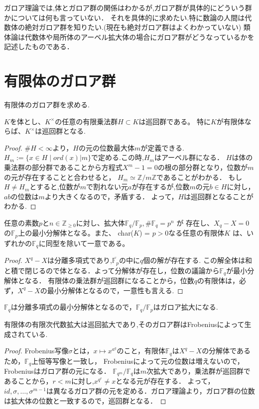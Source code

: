 \documentclass{ujarticle}
\begin{document}
ガロア理論では,体とガロア群の関係はわかるが,ガロア群が具体的にどういう群かについては何も言っていない．
それを具体的に求めたい.特に数論の人間は代数体の絶対ガロア群を知りたい.(現在も絶対ガロア群はよくわかっていない)
類体論は代数体や局所体のアーベル拡大体の場合にガロア群がどうなっているかを記述したものである．

\section{有限体のガロア群}
\label{sec:有限体のガロア群}

有限体のガロア群を求める.

\begin{prop}
  $K$を体とし、$K^{\times}$の任意の有限乗法群$H \subset  K$は巡回群である。
  特に$K$が有限体ならば、$K^{\times}$は巡回群となる.
\end{prop}
\begin{proof}
  $\# H < \infty$より，$H$の元の位数最大体$m$が定義できる.
  $H_m:= \{ x \in H \mid ord(x) | m\} $で定める.この時,$H_m$はアーベル群になる．
  $H$は体の乗法群の部分群であることから方程式$X^m -1 =0$の根の部分群となり，位数が$m$の元が存在することと合わせると，
  $H_m \simeq \mathbb{Z}/m \mathbb{Z}$であることがわかる．
  もし$H \neq H_m$とすると,位数が$m$で割れない元$a$が存在するが,位数$m$の元$b \in H$に対し，$ab$の位数は$m$より大きくなるので，矛盾する．
  よって，$H$は巡回群となることがわかる.
\end{proof}
\begin{prop}
任意の素数$p$と$n\in  \mathbb{Z}_{\ge 0}$に対し、拡大体$\mathbb{F}_q/\mathbb{F}_p, \#\mathbb{F}_q  =p^n$ が
存在し、$X_q − X = 0$ の$\mathbb{F}_p$上の最小分解体となる。また、
char($K$) = $p > 0$なる任意の有限体$K$ は、いずれかの$\mathbb{F}_q$に同型を除いて一意である。
\end{prop}
\begin{proof}
$X^q -X$は分離多項式であり,$\overline{\mathbb{F}_p}$の中に$q$個の解が存在する.
この解全体は和と積で閉じるので体となる．よって分解体が存在し，位数の議論から$\mathbb{F}_q$が最小分解体となる．
有限体の乗法群が巡回群になることから，位数$q$の有限体は，必ず，$X^q - X$の最小分解体となるので，一意性も言える.
\end{proof}

$\mathbb{F}_q$は分離多項式の最小分解体となるので，$\mathbb{F}_q/\mathbb{F}_p$はガロア拡大になる.
\begin{thm}
有限体の有限次代数拡大は巡回拡大であり,そのガロア群はFrobeniusによって生成されている.
\end{thm}
\begin{proof}
  Frobenius写像$\sigma$とは，$x \mapsto x^{a^q}$のこと，有限体$\mathbb{F}_q$は$X^q -X$の分解体であるため，$\mathbb{F}_q$上恒等写像と一致し，
  Frobeniusによって元の位数は増えないので，Frobeniusはガロア群の元になる．
  $\mathbb{F}_{q^m}/\mathbb{F}_q$は$m$次拡大であり，乗法群が巡回群であることから，$r < m$に対し,$x^{q^r} \neq x$となる元が存在する．
  よって，$id,\sigma,\dots,\sigma^{m-1}$は異なるガロア群の元を定める．ガロア理論より，ガロア群の位数は拡大体の位数と一致するので，巡回群となる．
\end{proof}
\end{document}
